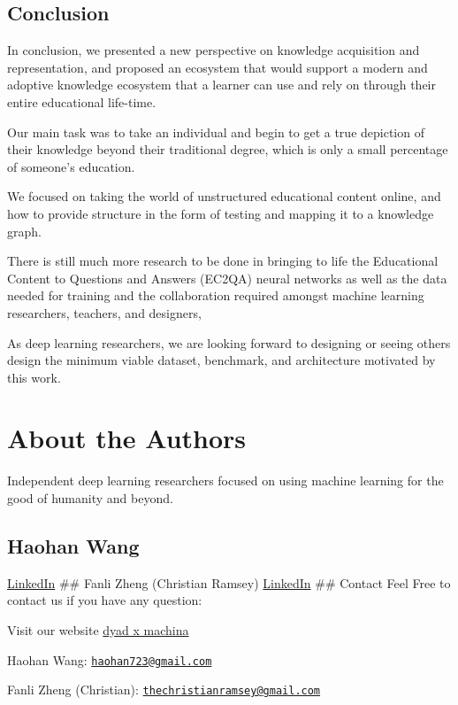 \documentclass[]{book}
\theoremstyle{definition}
\theoremstyle{definition}
\theoremstyle{definition}
\theoremstyle{remark}
\begin{document}
\hypertarget{mce-responses}{}
\hypertarget{mce-error-response}{}

\hypertarget{mce-success-response}{}

\section{Conclusion}\label{conclusion}

In conclusion, we presented a new perspective on knowledge acquisition
and representation, and proposed an ecosystem that would support a
modern and adoptive knowledge ecosystem that a learner can use and rely
on through their entire educational life-time.

Our main task was to take an individual and begin to get a true
depiction of their knowledge beyond their traditional degree, which is
only a small percentage of someone's education.

We focused on taking the world of unstructured educational content
online, and how to provide structure in the form of testing and mapping
it to a knowledge graph.

There is still much more research to be done in bringing to life the
Educational Content to Questions and Answers (EC2QA) neural networks as
well as the data needed for training and the collaboration required
amongst machine learning researchers, teachers, and designers,

As deep learning researchers, we are looking forward to designing or
seeing others design the minimum viable dataset, benchmark, and
architecture motivated by this work.

\chapter{About the Authors}\label{about-the-authors}

Independent deep learning researchers focused on using machine learning
for the good of humanity and beyond.

\section{Haohan Wang}\label{haohan-wang}

\href{https://www.linkedin.com/in/haohanw}{LinkedIn} \#\# Fanli Zheng
(Christian Ramsey)
\href{https://www.linkedin.com/in/christianramsey/}{LinkedIn} \#\#
Contact Feel Free to contact us if you have any question:

Visit our website \href{dyadxmachina.com}{dyad x machina}

Haohan Wang:
\href{mailto:haohan723@gmail.com}{\nolinkurl{haohan723@gmail.com}}

Fanli Zheng (Christian):
\href{mailto:thechristianramsey@gmail.com}{\nolinkurl{thechristianramsey@gmail.com}}


\end{document}

